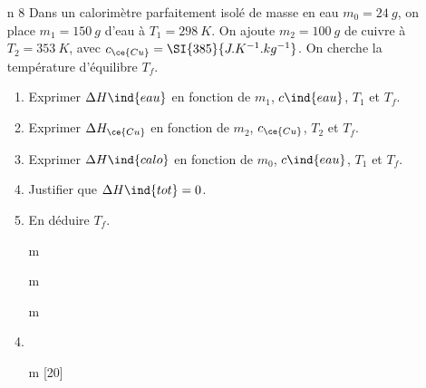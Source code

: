 \documentclass[a4paper, 10pt, final, garamond]{book}
\begin{document}
\begin{enumerate}[label=\sqenumi]
{{		}%
	}%
	\item[n]{8}
	Dans un calorimètre parfaitement isolé de masse en eau $m_0 = \SI{24}{g}$, on
	place $m_1 = \SI{150}{g}$ d'eau à $T_1 = \SI{298}{K}$. On ajoute $m_2 =
		\SI{100}{g}$ de cuivre à $T_2 = \SI{353}{K}$, avec $c_{\ce{Cu}} =
		\SI{385}{J.K^{-1}.kg^{-1}}$. On cherche la température d'équilibre $T_f$.
	\begin{enumerate}[label=\sqenumi]
		\item Exprimer $\Delta{H}\ind{eau}$ en fonction de $m_1$, $c\ind{eau}$,
		      $T_1$ et $T_f$.
		\item Exprimer $\Delta{H}_{\ce{Cu}}$ en fonction de $m_2$, $c_{\ce{Cu}}$,
		      $T_2$ et $T_f$.
		\item Exprimer $\Delta{H}\ind{calo}$ en fonction de $m_0$, $c\ind{eau}$,
		      $T_1$ et $T_f$.
		\item Justifier que $\Delta{H}\ind{tot} = 0$.
		\item En déduire $T_f$.
	\end{enumerate}
	\smallbreak
	\begin{enumerate}[label=\sqenumi]
		\item[m]
		\item[m]
		\item[m]
		\item {}%
		\item [m][20]
\end{enumerate}
\end{enumerate}
\end{document}
